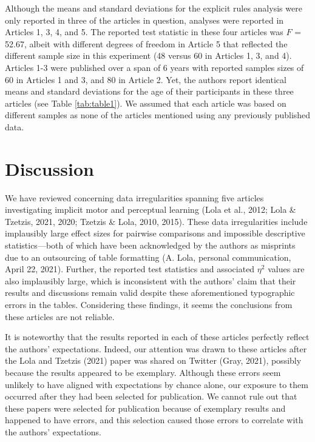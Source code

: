\documentclass[
  english,
  man,floatsintext]{apa7}
\begin{document}
Although the means and standard deviations for the explicit rules analysis were only reported in three of the articles in question, analyses were reported in Articles 1, 3, 4, and 5. The reported test statistic in these four articles was \(F\) = 52.67, albeit with different degrees of freedom in Article 5 that reflected the different sample size in this experiment (48 versus 60 in Articles 1, 3, and 4). Articles 1-3 were published over a span of 6 years with reported samples sizes of 60 in Articles 1 and 3, and 80 in Article 2. Yet, the authors report identical means and standard deviations for the age of their participants in these three articles (see Table \ref{tab:table1}). We assumed that each article was based on different samples as none of the articles mentioned using any previously published data.

\hypertarget{discussion}{%
\section{Discussion}\label{discussion}}

We have reviewed concerning data irregularities spanning five articles investigating implicit motor and perceptual learning (Lola et al., 2012; Lola \& Tzetzis, 2021, 2020; Tzetzis \& Lola, 2010, 2015). These data irregularities include implausibly large effect sizes for pairwise comparisons and impossible descriptive statistics---both of which have been acknowledged by the authors as misprints due to an outsourcing of table formatting (A. Lola, personal communication, April 22, 2021). Further, the reported test statistics and associated \(\eta^{2}\) values are also implausibly large, which is inconsistent with the authors' claim that their results and discussions remain valid despite these aforementioned typographic errors in the tables. Considering these findings, it seems the conclusions from these articles are not reliable.

It is noteworthy that the results reported in each of these articles perfectly reflect the authors' expectations. Indeed, our attention was drawn to these articles after the Lola and Tzetzis (2021) paper was shared on Twitter (Gray, 2021), possibly because the results appeared to be exemplary. Although these errors seem unlikely to have aligned with expectations by chance alone, our exposure to them occurred after they had been selected for publication. We cannot rule out that these papers were selected for publication because of exemplary results and happened to have errors, and this selection caused those errors to correlate with the authors' expectations.
\end{document}
